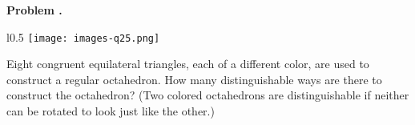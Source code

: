 \documentclass[11pt,letterpape, fleqn]{article}
\newcounter{problem}
\newcommand{\problem}{
	\stepcounter{problem}%
	\noindent \textbf{Problem \theproblem. }%
}
\begin{document}

\begin{minipage}{\textwidth}
    \problem

	\begin{wrapfigure}[11]{l}{0.5\textwidth}
		\texttt{[image: images-q25.png]}
   \end{wrapfigure}
   \noindent Eight congruent equilateral triangles, each of a different color, are used to construct a regular octahedron. How many distinguishable ways are there to construct the octahedron? (Two colored octahedrons are distinguishable if neither can be rotated to look just like the other.)

   \vspace{8cm}
\end{minipage}

\vspace{6cm}
\end{document}
